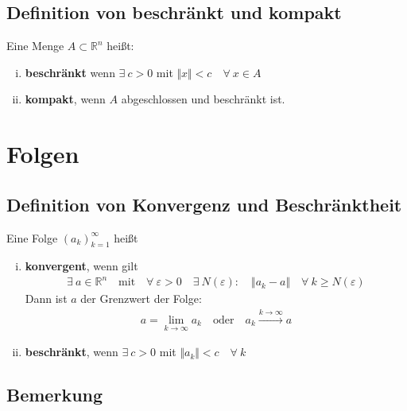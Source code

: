 \documentclass[11pt,a4paper]{book}
\newcommand {\Rn}	{\mathbb{R}^n}
\newcommand{\1}    	{\mathbbm{1}}
\begin{document}
\subsection{Definition von beschränkt und kompakt}
Eine Menge \(A \subset \Rn\) heißt:
\begin{enumerate}[(i)]
	\item \textbf{beschränkt} wenn \(\exists~ c > 0 \) mit \( \Vert x \Vert < c \quad \forall~ x \in A\)
	\item \textbf{kompakt}, wenn \(A\) abgeschlossen und beschränkt ist.
\end{enumerate}

\section{Folgen}

\subsection{Definition von Konvergenz und Beschränktheit}

Eine Folge \((a_k)_{k=1}^\infty \) heißt
\begin{enumerate}[(i)]
	\item \textbf{konvergent}, wenn gilt
	\begin{align*}
		\exists~ a \in \Rn \quad \textrm{mit} \quad \forall~ \varepsilon > 0 \quad \exists~ N(\varepsilon) : \quad \Vert a_k - a \Vert \quad \forall~ k \geqslant N(\varepsilon)
	\end{align*}
	Dann ist \(a\) der Grenzwert der Folge:
	\begin{align*}
		a = \lim_{k \rightarrow \infty} a_k \quad \textrm{oder} \quad a_k \stackrel{k \rightarrow \infty}{\rightarrow} a
	\end{align*}
	\item \textbf{beschränkt}, wenn \(\exists~ c > 0 \) mit \(\Vert a_k \Vert < c \quad \forall~ k \)
\end{enumerate}

\subsection{Bemerkung}
\end{document}
